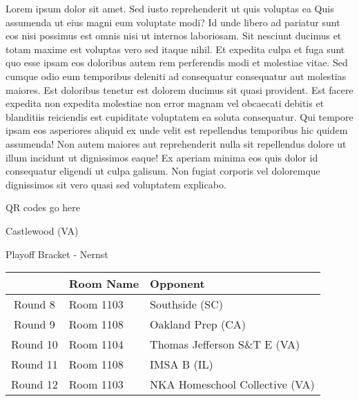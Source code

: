 \documentclass{article}%
\begin{document}
\vspace*{8pt}%
\linebreak%
\newline%
\newline%
Lorem ipsum dolor sit amet. Sed iusto reprehenderit ut quis voluptas ea Quis assumenda ut eius magni eum voluptate modi? Id unde libero ad pariatur sunt eos nisi possimus est omnis nisi ut internos laboriosam. Sit nesciunt ducimus et totam maxime est voluptas vero sed itaque nihil. Et expedita culpa et fuga sunt quo esse ipsam eos doloribus autem rem perferendis modi et molestiae vitae.\newline%
\newline%
Sed cumque odio eum temporibus deleniti ad consequatur consequatur aut molestias maiores. Est doloribus tenetur est dolorem ducimus sit quasi provident. Est facere expedita non expedita molestiae non error magnam vel obcaecati debitis et blanditiis reiciendis est cupiditate voluptatem ea soluta consequatur. Qui tempore ipsam eos asperiores aliquid ex unde velit est repellendus temporibus hic quidem assumenda!\newline%
\newline%
Non autem maiores aut reprehenderit nulla sit repellendus dolore ut illum incidunt ut dignissimos eaque! Ex aperiam minima eos quis dolor id consequatur eligendi ut culpa galisum. Non fugiat corporis vel doloremque dignissimos sit vero quasi sed voluptatem explicabo.\newline%
\newline%
%
\vspace*{30pt}%
\begin{center}%
\begin{Huge}%
QR codes go here%
\end{Huge}%
\end{center}%
\newpage%
\begin{center}%
\begin{Huge}%
Castlewood (VA)%
\end{Huge}%
\vspace*{8pt}%
\linebreak%
\begin{Large}%
Playoff Bracket {-} Nernst%
\end{Large}%
\end{center}%
%
\begin{tabularx}{\textwidth}{|c|Y|Y|}%
\hline%
&Room Name&Opponent\\%
\hline%
Round 8&Room 1103&Southside (SC)\\%
Round 9&Room 1108&Oakland Prep (CA)\\%
Round 10&Room 1104&Thomas Jefferson S\&T E (VA)\\%
Round 11&Room 1108&IMSA B (IL)\\%
Round 12&Room 1103&NKA Homeschool Collective (VA)\\%
\hline%
\end{tabularx}%
\end{document}
